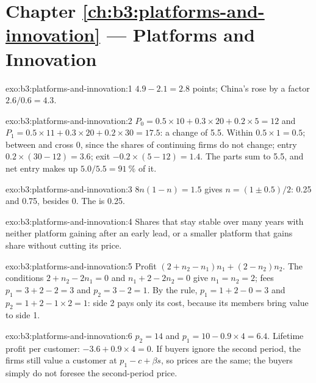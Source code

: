 \section*{Chapter \ref{ch:b3:platforms-and-innovation} --- Platforms and Innovation}

\begin{solution}{exo:b3:platforms-and-innovation:1}
$4.9 - 2.1 = 2.8$ points; China's rose by a factor $2.6/0.6 = 4.3$. %
\end{solution}

\begin{solution}{exo:b3:platforms-and-innovation:2}
$P_0 = 0.5 \times 10 + 0.3 \times 20 + 0.2 \times 5 = 12$ and $P_1 = 0.5 \times 11 + 0.3 \times 20 + 0.2 \times 30 = 17.5$: a change of 5.5. Within $0.5 \times 1 = 0.5$; between and
cross 0, since the shares of continuing firms do not change; entry $0.2 \times (30 - 12) = 3.6$; exit
$-0.2 \times (5 - 12) = 1.4$. The parts sum to 5.5, and net entry makes up $5.0/5.5 = 91~\%$ of it.
\end{solution}

\begin{solution}{exo:b3:platforms-and-innovation:3}
$8n(1 - n) = 1.5$ gives $n = (1 \pm 0.5)/2$: 0.25 and 0.75, besides 0. The  is 0.25.
\end{solution}

\begin{solution}{exo:b3:platforms-and-innovation:4}
Shares that stay stable over many years with neither platform gaining after an
early lead, or a smaller platform that gains share without cutting its price.
\end{solution}

\begin{solution}{exo:b3:platforms-and-innovation:5}
Profit $(2 + n_2 - n_1)n_1 + (2 - n_2)n_2$. The conditions $2 + n_2 - 2n_1 = 0$ and $n_1 + 2 - 2n_2 = 0$ give $n_1 = n_2 = 2$; fees $p_1 = 3 + 2 - 2 = 3$
and $p_2 = 3 - 2 = 1$. By the rule, $p_1 = 1 + 2 - 0 = 3$ and $p_2 = 1 + 2 - 1 \times 2 = 1$: side 2 pays only its cost, because its members
bring value to side 1.
\end{solution}

\begin{solution}{exo:b3:platforms-and-innovation:6}
$p_2 = 14$ and $p_1 = 10 - 0.9 \times 4 = 6.4$. Lifetime profit per customer: $-3.6 + 0.9 \times 4 = 0$. If buyers ignore the second
period, the firms still value a customer at $p_1 - c + \beta s$, so prices are the same; the buyers
simply do not foresee the second-period price.
\end{solution}

